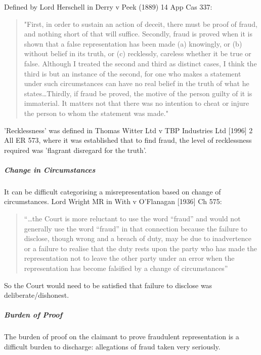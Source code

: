 \documentclass[
]{article}
\begin{document}
Defined by Lord Herschell in Derry v Peek (1889) 14 App Cas 337:

\begin{quote}
"First, in order to sustain an action of deceit, there must be proof of
fraud, and nothing short of that will suffice. Secondly, fraud is proved
when it is shown that a false representation has been made (a)
knowingly, or (b) without belief in its truth, or (c) recklessly,
careless whether it be true or false. Although I treated the second and
third as distinct cases, I think the third is but an instance of the
second, for one who makes a statement under such circumstances can have
no real belief in the truth of what he states\ldots Thirdly, if fraud be
proved, the motive of the person guilty of it is immaterial. It matters
not that there was no intention to cheat or injure the person to whom
the statement was made."
\end{quote}

'Recklessness' was defined in Thomas Witter Ltd v TBP Industries Ltd
{[}1996{]} 2 All ER 573, where it was established that to find fraud,
the level of recklessness required was 'flagrant disregard for the
truth'.

\hypertarget{change-in-circumstances}{%
\subparagraph{Change in Circumstances}\label{change-in-circumstances}}

It can be difficult categorising a misrepresentation based on change of
circumstances. Lord Wright MR in With v O'Flanagan {[}1936{]} Ch 575:

\begin{quote}
``\ldots the Court is more reluctant to use the word ``fraud'' and would
not generally use the word ``fraud'' in that connection because the
failure to disclose, though wrong and a breach of duty, may be due to
inadvertence or a failure to realise that the duty rests upon the party
who has made the representation not to leave the other party under an
error when the representation has become falsified by a change of
circumstances''
\end{quote}

So the Court would need to be satisfied that failure to disclose was
deliberate/dishonest.

\hypertarget{burden-of-proof}{%
\subparagraph{Burden of Proof}\label{burden-of-proof}}

The burden of proof on the claimant to prove fraudulent representation
is a difficult burden to discharge: allegations of fraud taken very
seriously.
\end{document}
